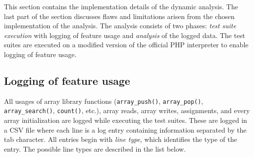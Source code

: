 This section contains the implementation details of the dynamic analysis. The last part of the section discusses flaws and limitations arisen from the chosen implementation of the analysis. The analysis consists of two phases: \textit{test suite execution} with logging of feature usage and \textit{analysis} of the logged data. The test suites are executed on a modified version of the official PHP interpreter to enable logging of feature usage.

\subsection{Logging of feature usage}
All usages of array library functions (\texttt{array\_push()}, \texttt{array\_pop()}, \texttt{array\_search()}, \texttt{count()}, etc.), array reads, array writes, assignments, and every array initialization are logged while executing the test suites. These are logged in a CSV file where each line is a log entry containing information separated by the tab character. All entries begin with  \emph{line type}, which identifies the type of the entry. The possible line types are described in the list below.

